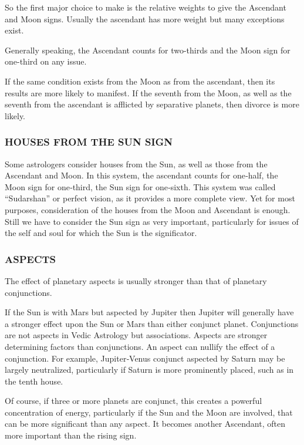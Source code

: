  

So the first major choice to make is the relative weights to give the Ascendant and Moon signs. Usually the ascendant has more weight but many exceptions exist.

Generally speaking, the Ascendant counts for two-thirds and the Moon sign for one-third on any issue.
 

If the same condition exists from the Moon as from the ascendant, then its results are more likely to manifest. If the seventh from the Moon, as well as the seventh from the ascendant is afflicted by separative planets, then divorce is more likely.

 

\subsubsection{HOUSES FROM THE SUN SIGN}

 

Some astrologers consider houses from the Sun, as well as those from the Ascendant and Moon. In this system, the ascendant counts for one‑half, the Moon sign for one‑third, the Sun sign for one‑sixth. This system was called “Sudarshan” or perfect vision, as it provides a more complete view. Yet for most purposes, consideration of the houses from the Moon and Ascendant is enough. Still we have to consider the Sun sign as very important, particularly for issues of the self and soul for which the Sun is the significator.

 

\subsubsection{ASPECTS}

 

The effect of planetary aspects is usually stronger than that of planetary conjunctions.
 

If the Sun is with Mars but aspected by Jupiter then Jupiter will generally have a stronger effect upon the Sun or Mars than either conjunct planet. Conjunctions are not aspects in Vedic Astrology but associations. Aspects are stronger determining factors than conjunctions. An aspect can nullify the effect of a conjunction. For example, Jupiter‑Venus conjunct aspected by Saturn may be largely neutralized, particularly if Saturn is more prominently placed, such as in the tenth house.

 

Of course, if three or more planets are conjunct, this creates a powerful concentration of energy, particularly if the Sun and the Moon are involved, that can be more significant than any aspect. It becomes another Ascendant, often more important than the rising sign.

